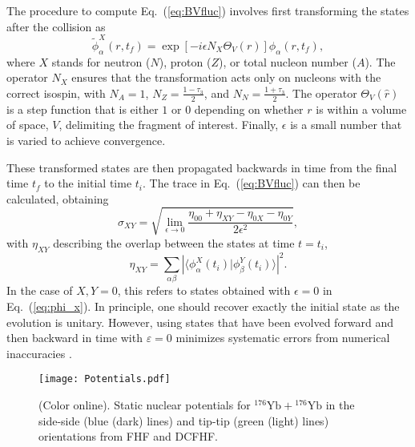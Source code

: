\documentclass[reprint,aps,prc,twocolumn,superscriptaddress,floatfix,10pt]{revtex4-2}
\begin{document}
The procedure to compute Eq.~(\ref{eq:BVfluc}) involves first transforming the states after the collision as
\begin{equation}
\tilde{\phi}^X_\alpha(r,t_f)=\exp[-i\epsilon N_X\Theta_V({r})]\phi_\alpha(r,t_f),\label{eq:phi_x}
\end{equation}
where $X$ stands for neutron ($N$), proton ($Z$), or total nucleon number ($A$).
The operator $N_X$ ensures that the transformation acts only on nucleons with the correct isospin, with $N_A=1$, $N_Z=\frac{1-\tau_3}{2}$, and $N_N=\frac{1+\tau_3}{2}$.  
The operator $\Theta_V(\hat{r})$ is a step function that is either $1$ or $0$ depending on whether $r$ is within a volume of space, $V$, delimiting the fragment of interest.
Finally, $\epsilon$ is a small number that is varied to achieve convergence.

These transformed states are then propagated backwards in time from the final time $t_f$ to the initial time $t_i$.
The trace in Eq.~(\ref{eq:BVfluc}) can then be calculated, obtaining
\begin{equation}\label{eq:sigma}
\sigma_{XY} = \sqrt{\lim_{\epsilon\rightarrow0}\frac{\eta_{00}+\eta_{XY}-\eta_{0X}-\eta_{0Y}}{2\epsilon^2}},
\end{equation}
with $\eta_{XY}$ describing the overlap between the states at  time $t=t_i$,
\begin{equation}
\eta_{XY}=\sum_{\alpha \beta}\left|\langle\phi_\alpha^X(t_i)|\phi_\beta^Y(t_i)\rangle\right|^2.
\end{equation}
In the case of $X,Y=0$, this refers to states obtained with $\epsilon=0$ in Eq.~(\ref{eq:phi_x}).
In principle, one should recover exactly the initial state as the evolution is unitary.
However, using states that have been evolved forward and then backward in time with $\varepsilon=0$ minimizes systematic errors from numerical inaccuracies \cite{bonche1985,broomfield2009}. 

\begin{figure}[!htb]
	\texttt{[image: Potentials.pdf]}
	\caption{\protect(Color online). Static nuclear potentials for $^{176}\mathrm{Yb}+{}^{176}\mathrm{Yb}$ in the side-side (blue (dark) lines) and tip-tip (green (light) lines) orientations from FHF and DCFHF.}
	\label{fig:pot}
\end{figure}
\end{document}
